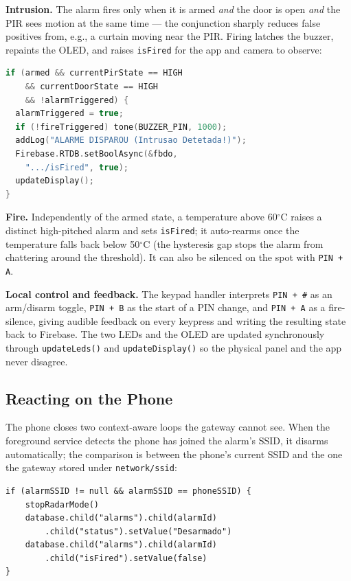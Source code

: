 \documentclass[10pt,twocolumn]{article}
\begin{document}
\textbf{Intrusion.} The alarm fires only when it is armed \emph{and} the door is open \emph{and} the PIR sees motion at the same time --- the conjunction sharply reduces false positives from, e.g., a curtain moving near the PIR. Firing latches the buzzer, repaints the OLED, and raises \texttt{isFired} for the app and camera to observe:

\begin{lstlisting}[language=C++]
if (armed && currentPirState == HIGH
    && currentDoorState == HIGH
    && !alarmTriggered) {
  alarmTriggered = true;
  if (!fireTriggered) tone(BUZZER_PIN, 1000);
  addLog("ALARME DISPAROU (Intrusao Detetada!)");
  Firebase.RTDB.setBoolAsync(&fbdo,
    ".../isFired", true);
  updateDisplay();
}
\end{lstlisting}

\textbf{Fire.} Independently of the armed state, a temperature above 60$^{\circ}$C raises a distinct high-pitched alarm and sets \texttt{isFired}; it auto-rearms once the temperature falls back below 50$^{\circ}$C (the hysteresis gap stops the alarm from chattering around the threshold). It can also be silenced on the spot with \texttt{PIN + A}.

\textbf{Local control and feedback.} The keypad handler interprets \texttt{PIN + \#} as an arm/disarm toggle, \texttt{PIN + B} as the start of a PIN change, and \texttt{PIN + A} as a fire-silence, giving audible feedback on every keypress and writing the resulting state back to Firebase. The two LEDs and the OLED are updated synchronously through \texttt{updateLeds()} and \texttt{updateDisplay()} so the physical panel and the app never disagree.

\subsection{Reacting on the Phone}
The phone closes two context-aware loops the gateway cannot see. When the foreground service detects the phone has joined the alarm's SSID, it disarms automatically; the comparison is between the phone's current SSID and the one the gateway stored under \texttt{network/ssid}:

\begin{lstlisting}
if (alarmSSID != null && alarmSSID == phoneSSID) {
    stopRadarMode()
    database.child("alarms").child(alarmId)
        .child("status").setValue("Desarmado")
    database.child("alarms").child(alarmId)
        .child("isFired").setValue(false)
}
\end{lstlisting}
\end{document}
